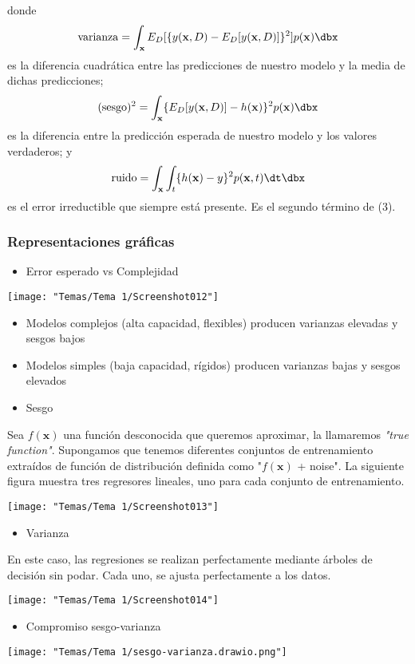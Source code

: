 donde \[ \mathrm{varianza}=\int_\mathbf{x}E_D[\{y(\mathbf{x},D)-E_D[y(\mathbf{x},D)]\}^2]p(\mathbf{x})\dbx \] es la diferencia cuadrática entre las predicciones de nuestro modelo y la media de dichas predicciones; \[ (\mathrm{sesgo})^2=\int_\mathbf{x}\{E_D[y(\mathbf{x},D)]-h(\mathbf{x})\}^2p(\mathbf{x})\dbx \]es la diferencia entre la predicción esperada de nuestro modelo y los valores verdaderos; y \[ \mathrm{ruido}=\int_\mathbf{x}\int_t\{h(\mathbf{x})-y\}^2p(\mathbf{x},t)\dt\dbx \]es el error irreductible que siempre está presente. Es el segundo término de (3).
\subsubsection*{Representaciones gráficas}
\begin{itemize}[label=\color{red}\textbullet, leftmargin=*]
	\item \color{lightblue}Error esperado vs Complejidad
\end{itemize}
\begin{center}
	\texttt{[image: "Temas/Tema 1/Screenshot012"]}
\end{center}
\begin{itemize}
	\item Modelos complejos (alta capacidad, flexibles) producen varianzas elevadas y sesgos bajos
	\item Modelos simples (baja capacidad, rígidos) producen varianzas bajas y sesgos elevados
\end{itemize}
\begin{itemize}[label=\color{red}\textbullet, leftmargin=*]
	\item \color{lightblue}Sesgo
\end{itemize}
Sea $f(\mathbf{x})$ una función desconocida que queremos aproximar, la llamaremos \textit{"true function"}. Supongamos que tenemos diferentes conjuntos de entrenamiento extraídos de función de distribución definida como "$f(\mathbf{x})$ + noise". La siguiente figura muestra tres regresores lineales, uno para cada conjunto de entrenamiento.
\begin{center}
	\texttt{[image: "Temas/Tema 1/Screenshot013"]}
\end{center}

\begin{itemize}[label=\color{red}\textbullet, leftmargin=*]
	\item \color{lightblue}Varianza
\end{itemize}
En este caso, las regresiones se realizan perfectamente mediante árboles de decisión sin podar. Cada uno, se ajusta perfectamente a los datos.
\begin{center}
	\texttt{[image: "Temas/Tema 1/Screenshot014"]}
\end{center}
\begin{itemize}[label=\color{red}\textbullet, leftmargin=*]
	\item \color{lightblue}Compromiso sesgo-varianza
\end{itemize}
\begin{center}
	\texttt{[image: "Temas/Tema 1/sesgo-varianza.drawio.png"]}
\end{center}

